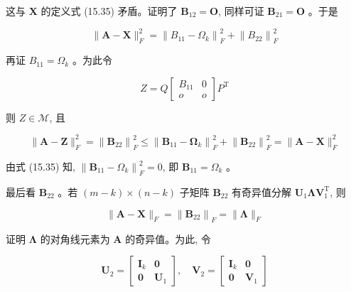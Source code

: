 \documentclass[10pt]{article}
\begin{document}
这与 $\boldsymbol{X}$ 的定义式 (15.35) 矛盾。证明了 $\boldsymbol{B}_{12}=\boldsymbol{O}$, 同样可证 $\boldsymbol{B}_{21}=\boldsymbol{O}$ 。于是


\begin{equation*}
\|\boldsymbol{A}-\boldsymbol{X}\|_{F}^{2}=\left\|B_{11}-\Omega_{k}\right\|_{F}^{2}+\left\|B_{22}\right\|_{F}^{2} \tag{15.39}
\end{equation*}


再证 $B_{11}=\Omega_{k}$ 。为此令

$$
Z=Q\left[\begin{array}{cc}
B_{11} & 0 \\
o & o
\end{array}\right] P^{\mathrm{T}}
$$

则 $Z \in \mathcal{M}$, 且


\begin{equation*}
\|\boldsymbol{A}-\boldsymbol{Z}\|_{F}^{2}=\left\|\boldsymbol{B}_{22}\right\|_{F}^{2} \leqslant\left\|\boldsymbol{B}_{11}-\boldsymbol{\Omega}_{k}\right\|_{F}^{2}+\left\|\boldsymbol{B}_{22}\right\|_{F}^{2}=\|\boldsymbol{A}-\boldsymbol{X}\|_{F}^{2} \tag{15.40}
\end{equation*}


由式 (15.35) 知, $\left\|\boldsymbol{B}_{11}-\Omega_{k}\right\|_{F}^{2}=0$, 即 $\boldsymbol{B}_{11}=\Omega_{k}$ 。

最后看 $\boldsymbol{B}_{22}$ 。若 $(m-k) \times(n-k)$ 子矩阵 $\boldsymbol{B}_{22}$ 有奇异值分解 $\boldsymbol{U}_{1} \boldsymbol{\Lambda} \boldsymbol{V}_{1}^{\mathrm{T}}$, 则


\begin{equation*}
\|\boldsymbol{A}-\boldsymbol{X}\|_{F}=\left\|\boldsymbol{B}_{22}\right\|_{F}=\|\boldsymbol{\Lambda}\|_{F} \tag{15.41}
\end{equation*}


证明 $\boldsymbol{\Lambda}$ 的对角线元素为 $\boldsymbol{A}$ 的奇异值。为此, 令

$$
\boldsymbol{U}_{2}=\left[\begin{array}{cc}
\boldsymbol{I}_{k} & \boldsymbol{0} \\
\boldsymbol{0} & \boldsymbol{U}_{1}
\end{array}\right], \quad \boldsymbol{V}_{2}=\left[\begin{array}{cc}
\boldsymbol{I}_{k} & \boldsymbol{0} \\
\boldsymbol{0} & \boldsymbol{V}_{1}
\end{array}\right]
$$
\end{document}

